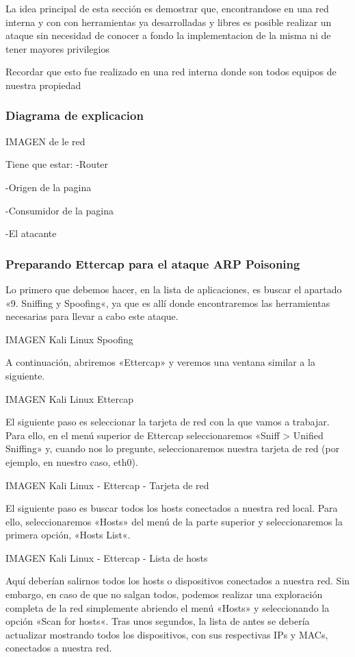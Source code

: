 La idea principal de esta sección es demostrar que, encontrandose en una red interna
y con con herramientas ya desarrolladas y libres es posible realizar un ataque 
sin necesidad de conocer a fondo la implementacion de la misma ni de tener mayores
privilegios

Recordar que esto fue realizado en una red interna donde son todos equipos de nuestra propiedad

\subsubsection{Diagrama de explicacion}
IMAGEN de le red

Tiene que estar:
-Router

-Origen de la pagina

-Consumidor de la pagina

-El atacante

\subsubsection{Preparando Ettercap para el ataque ARP Poisoning}

Lo primero que debemos hacer, en la lista de aplicaciones, es buscar el apartado 
«9. Sniffing y Spoofing«, ya que es allí donde encontraremos las herramientas necesarias
 para llevar a cabo este ataque.

IMAGEN Kali Linux Spoofing

A continuación, abriremos «Ettercap» y veremos una ventana similar a la siguiente.

IMAGEN  Kali Linux Ettercap

El siguiente paso es seleccionar la tarjeta de red con la que vamos a trabajar. Para ello, en el menú superior de Ettercap seleccionaremos «Sniff > Unified Sniffing» y, cuando nos lo pregunte, seleccionaremos nuestra tarjeta de red (por ejemplo, en nuestro caso, eth0).

IMAGEN Kali Linux - Ettercap - Tarjeta de red

El siguiente paso es buscar todos los hosts conectados a nuestra red local. Para ello, seleccionaremos «Hosts» del menú de la parte superior y seleccionaremos la primera opción, «Hosts List«.

IMAGEN Kali Linux - Ettercap - Lista de hosts

Aquí deberían salirnos todos los hosts o dispositivos conectados a nuestra red. Sin embargo, en caso de que no salgan todos, podemos realizar una exploración completa de la red simplemente abriendo el menú «Hosts» y seleccionando la opción «Scan for hosts«. Tras unos segundos, la lista de antes se debería actualizar mostrando todos los dispositivos, con sus respectivas IPs y MACs, conectados a nuestra red.

